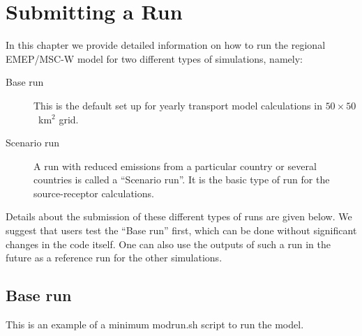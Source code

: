 \chapter{Submitting a Run}
\label{ch:SubmitARun}

In this chapter we provide detailed information on how to run the
regional EMEP/MSC-W model for two different types of simulations, namely: 

\begin{description}
\item[Base run]
This is the default set up for yearly transport model calculations
in $50\times50$~km$^2$ grid. 
\item[Scenario run]
 A run with reduced emissions from a particular country or several
 countries is called 
a ``Scenario run''. It is the basic type of run for the source-receptor
calculations. 
\end{description}

\noindent
Details about the submission of these
different types of runs are given below. We suggest that users test
the ``Base run'' first, which can be done without significant changes in
the code itself. One can also use the outputs of such a run in the
future as a reference run for the other simulations.\\  
% 

\newpage
\section{Base run}

This is an example of a minimum modrun.sh script to run the model.

